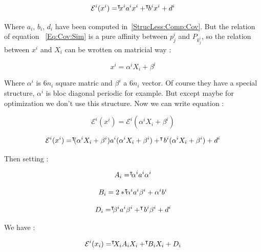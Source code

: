 \begin{equation}
    \mathcal{E}^i (x^i) =    ^{\intercal} \!\!\! {x^i}   a^i x^i  +   ^{\intercal} \!\! {b^i}   x^i   + d^i
\end{equation}

Where $a_i$, $b_i$, $d_i$  have been computed in~\ref{StrucLess:Comp:Cov}.
But the relation of equation ~\ref{Eq:Cov:Sim} is a pure affinity between $p^i_j$
and $P_{k^i_j}$, so the relation between $x^i$ and $X_i$  can be wrotten on matricial way :

\begin{equation}
    x^i =    \alpha^i X_i + \beta^i
\end{equation}

Where $\alpha^i$ is $6n_i$ square matric and $\beta^i$ a $6n_i$ vector.
Of course they have a special structure, $\alpha^i$ is bloc diagonal periodic for example.
But except maybe for optimization we don't use this structure.
Now we can write equation :

\begin{equation}
    \mathcal{E}^i (x^i) =    \mathcal{E}^i (\alpha^i X_i + \beta^i)
\end{equation}

\begin{equation}
    \mathcal{E}^i (x^i) =     ^{\intercal} \!\!\! (\alpha^i X_i + \beta^i) a^i (\alpha^i X_i + \beta^i) +  ^{\intercal} \! {b^i}   (\alpha^i X_i + \beta^i)  + d^i
\end{equation}

Then setting :

\begin{equation}
     A_i =     ^{\intercal} \!\!\! \alpha^i  a^i \alpha^i
\end{equation}

\begin{equation}
     B_i =       2*  ^{\intercal} \!\!\! \alpha^i  a^i  \beta^i     + \alpha^i b^i
\end{equation}

\begin{equation}
     D_i =        ^{\intercal} \!\!\! \beta^i  a^i  \beta^i  +  ^{\intercal} \!{b^i} \beta^i +        d^i
\end{equation}

We have :

\begin{equation}
    \mathcal{E}^i (x_i) =    ^{\intercal} \!\!\! {X_i}   A_i X_i  +   ^{\intercal} \!\! {B_i}   X_i   + D_i
\end{equation}

